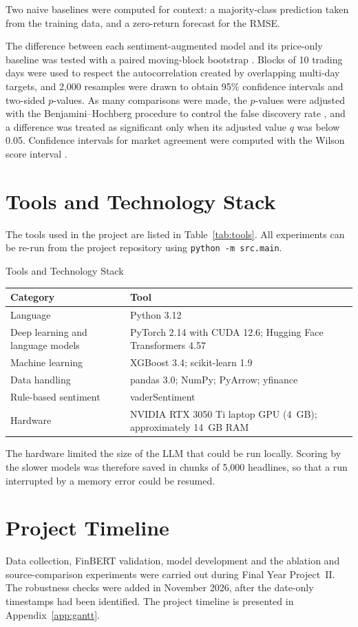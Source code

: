 Two naive baselines were computed for context: a majority-class prediction taken from the training data, and a zero-return forecast for the RMSE.

The difference between each sentiment-augmented model and its price-only baseline was tested with a paired moving-block bootstrap \parencite{kunsch1989jackknife}. Blocks of 10 trading days were used to respect the autocorrelation created by overlapping multi-day targets, and 2,000 resamples were drawn to obtain 95\% confidence intervals and two-sided $p$-values. As many comparisons were made, the $p$-values were adjusted with the Benjamini--Hochberg procedure to control the false discovery rate \parencite{benjamini1995controlling}, and a difference was treated as significant only when its adjusted value $q$ was below 0.05. Confidence intervals for market agreement were computed with the Wilson score interval \parencite{wilson1927probable}.

\section{Tools and Technology Stack}
\label{sec:tools}
The tools used in the project are listed in Table~\ref{tab:tools}. All experiments can be re-run from the project repository using \texttt{python -m src.main}.

\begin{utptable}{Tools and Technology Stack}
\label{tab:tools}
\begin{tabular}{@{}P{4.5cm}P{9.5cm}@{}}
\toprule
\textbf{Category} & \textbf{Tool} \\
\midrule
Language & Python 3.12 \\
Deep learning and language models & PyTorch 2.14 with CUDA 12.6; Hugging Face Transformers 4.57 \\
Machine learning & XGBoost 3.4; scikit-learn 1.9 \\
Data handling & pandas 3.0; NumPy; PyArrow; yfinance \\
Rule-based sentiment & vaderSentiment \\
Hardware & NVIDIA RTX 3050 Ti laptop GPU (4~GB); approximately 14~GB RAM \\
\bottomrule
\end{tabular}
\end{utptable}

The hardware limited the size of the LLM that could be run locally. Scoring by the slower models was therefore saved in chunks of 5,000 headlines, so that a run interrupted by a memory error could be resumed.

\section{Project Timeline}
\label{sec:timeline}
Data collection, FinBERT validation, model development and the ablation and source-comparison experiments were carried out during Final Year Project~II. The robustness checks were added in November 2026, after the date-only timestamps had been identified. The project timeline is presented in Appendix~\ref{app:gantt}.
